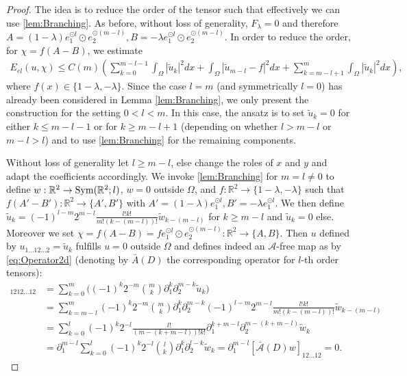 \documentclass[a4paper, 10pt, twoside, notitlepage]{amsart}
\theoremstyle{plain}
\newcommand{\R}{\mathbb{R}}
\newcommand{\p}{\partial}
\newcommand{\A}{\mathcal{A}}
\begin{document}
		\begin{proof}
			The idea is to reduce the order of the tensor such that effectively we can use \cref{lem:Branching}.  As before, without loss of generality, $F_\lambda = 0$ and therefore
			$A = (1-\lambda) e_1^{\odot l} \odot e_2^{\odot(m-l)}, B = - \lambda e_1^{\odot l} \odot e_2^{\odot (m-l)}$.  In order to reduce the order, for  $\chi = f (A-B)$, we estimate
			\begin{align*}
				E_{el}(u,\chi) \leq C(m) \left( \sum_{k=0}^{m-l-1} \int_\Omega |\tilde{u}_k|^2 dx + \int_\Omega |\tilde{u}_{m-l} - f|^2 dx + \sum_{k=m-l+1}^m \int_\Omega |\tilde{u}_k|^2 dx \right),
			\end{align*}
			where $f(x) \in \{1-\lambda,-\lambda\}$. Since the case $l=m$ (and symmetrically $l=0$) has already been considered in Lemma \ref{lem:Branching}, we only present the construction for the setting $0<l<m$. In this case, the ansatz is to set $\tilde{u}_k = 0$ for either $k \leq m-l-1$ or for $k \geq m-l+1$ (depending on whether $l>m-l$ or $m-l>l$) and to use \cref{lem:Branching} for the remaining components.   

                        \smallskip 
                                               Without loss of generality let $l \geq m-l$, else change the roles of $x$ and $y$ and adapt the coefficients accordingly.
                        We invoke \cref{lem:Branching} for $m = l \neq 0$ to define $w: \R^2 \to \textup{Sym}(\R^2;l)$, $w = 0$ outside $\Omega$, and $f: \R^2 \to \{1-\lambda,-\lambda\}$ such that
			$f (A'-B'): \R^2 \to \{A',B'\}$ with $A'= (1-\lambda) e_1^{\odot l},B' = -\lambda e_1^{\odot l}$. 
			We then define
			$\tilde{u}_k = (-1)^{l-m} 2^{m-l} \frac{l!k!}{m!(k-(m-l))!} \tilde{w}_{k-(m-l)}$ for $k \geq m-l$ and $\tilde{u}_k=0$ else. 
                        Moreover we set $\chi = f (A-B) = f e_1^{\odot l} \odot e_2^{\odot (m-l)}: \R^2 \to \{A,B\}$.  Then $u$ defined by $u_{1\dots12\dots2} = \tilde{u}_k$ fulfills $u=0$ outside $\Omega$ and defines indeed an $\A$-free map as by \eqref{eq:Operator2d} (denoting by $\bar{A}(D)$ the corresponding operator for $l$-th order tensors):
			\begin{align*}
				[\A(D)u]_{1212\dots12} & = \sum_{k=0}^m \Big( (-1)^k 2^{-m} \binom{m}{k} \p_1^k \p_2^{m-k} \tilde{u}_k \Big) \\
				& = \sum_{k=m-l}^m (-1)^k 2^{-m} \binom{m}{k} \p_1^k \p_2^{m-k}(-1)^{l-m} 2^{m-l} \frac{l!k!}{m!(k-(m-l))!} \tilde{w}_{k-(m-l)} \\
                                & = \sum_{k=0}^l (-1)^k 2^{-l}\frac{l!}{(m-(k+m-l))!k!}\p_1^{k+m-l} \p_2^{m-(k+m-l)} \tilde{w}_{k} \\
				& = \p_1^{m-l} \sum_{k=0}^l (-1)^k 2^{-l} \binom{l}{k} \p_1^k \p_2^{l-k} \tilde{w}_k = \p_1^{m-l} [\bar{\A}(D)w]_{12\dots12} = 0.
			\end{align*} 
		

\end{proof}
\end{document}
